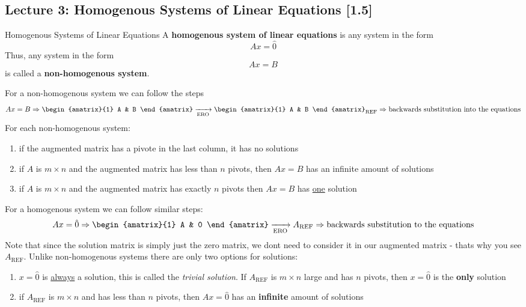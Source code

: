 \subsection{Lecture 3: Homogenous Systems of Linear Equations [1.5]}

\begin{defbox}{Homogenous Systems of Linear Equations}{}
    A \textbf{homogenous system of linear equations} is any system in the form 
    \[Ax = \hat{0}\]
    Thus, any system in the form \[Ax = B\] is called a \textbf{non-homogenous system}. 
\end{defbox}

For a non-homogenous system we can follow the steps
\[ Ax = B \Rightarrow \begin{amatrix}{1} A & B \end{amatrix} \xrightarrow[\text{ERO}]{} \begin{amatrix}{1} A & B \end{amatrix}_{\text{REF}} \Rightarrow \text{backwards substitution into the equations}\]
For each non-homogenous system:
\begin{enumerate}
    \item if the augmented matrix has a pivote in the last column, it has no solutions
    \item if $A$ is $m \times n$ and the augmented matrix has less than $n$ pivots, then $Ax=B$ has an infinite amount of solutions
    \item if $A$ is $m \times n$ and the augmented matrix has exactly $n$ pivots then $Ax=B$ has \underline{one} solution
\end{enumerate}
For a homogenous system we can follow similar steps:
\[Ax = \hat{0} \Rightarrow \begin{amatrix}{1} A & 0 \end{amatrix}\xrightarrow[\text{ERO}]{} A_{\text{REF}} \Rightarrow \text{backwards substitution to the equations}\]
Note that since the solution matrix is simply just the zero matrix, we dont need to consider it in our augmented matrix - thats why you see $A_\text{REF}$. Unlike non-homogenous systems there are only two options for solutions:
\begin{enumerate}
    \item $x=\hat{0}$ is \underline{always} a solution, this is called the \textit{trivial solution}. If $A_\text{REF}$ is $m \times n$ large and has $n$ pivots, then $x=\hat{0}$ is the \textbf{only} solution
    \item if $A_{\text{REF}}$ is $m \times n$ and has less than $n$ pivots, then $Ax=\hat{0}$ has an \textbf{infinite} amount of solutions
\end{enumerate}


